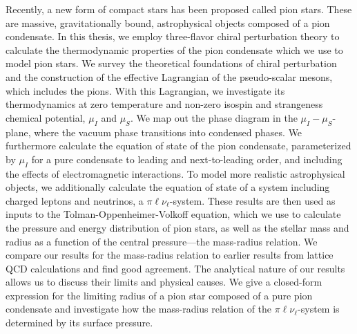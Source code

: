 \vspace*{1.5cm}
Recently, a new form of compact stars has been proposed called pion stars.
These are massive, gravitationally bound, astrophysical objects composed of a pion condensate.
In this thesis, we employ three-flavor chiral perturbation theory to calculate the thermodynamic properties of the pion condensate which we use to model pion stars.
We survey the theoretical foundations of chiral perturbation and the construction of the effective Lagrangian of the pseudo-scalar mesons, which includes the pions.
With this Lagrangian, we investigate its thermodynamics at zero temperature and non-zero isospin and strangeness chemical potential, $\mu_I$ and $\mu_S$.
We map out the phase diagram in the $\mu_I-\mu_S$-plane, where the vacuum phase transitions into condensed phases.
We furthermore calculate the equation of state of the pion condensate, parameterized by $\mu_I$ for a pure condensate to leading and next-to-leading order, and including the effects of electromagnetic interactions.
To model more realistic astrophysical objects, we additionally calculate the equation of state of a system including charged leptons and neutrinos, a $\pi\ell\nu_\ell$-system.
These results are then used as inputs to the Tolman-Oppenheimer-Volkoff equation, which we use to calculate the pressure and energy distribution of pion stars, as well as the stellar mass and radius as a function of the central pressure---the mass-radius relation.
We compare our results for the mass-radius relation to earlier results from lattice QCD calculations and find good agreement.
The analytical nature of our results allows us to discuss their limits and physical causes.
We give a closed-form expression for the limiting radius of a pion star composed of a pure pion condensate and investigate how the mass-radius relation of the $\pi\ell\nu_\ell$-system is determined by its surface pressure.


